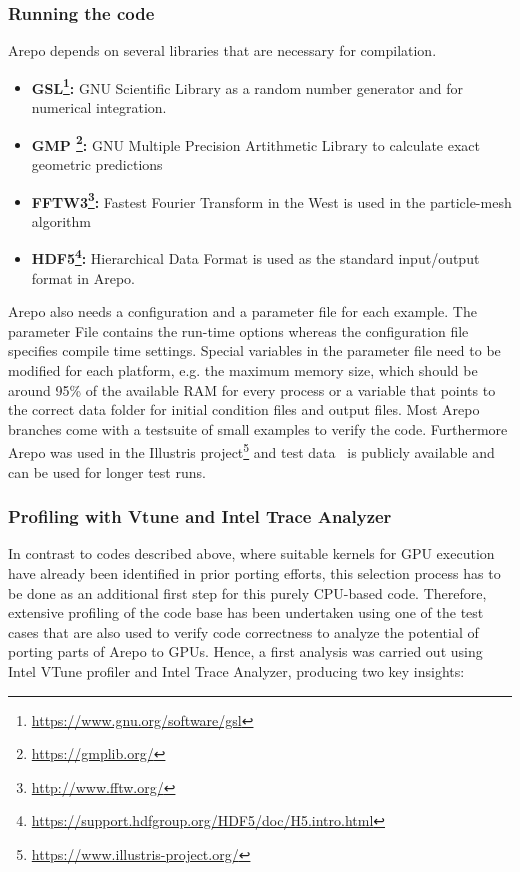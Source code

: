 \documentclass[../main]{subfiles}
\begin{document}
\subsubsection{Running the code}
Arepo depends on several libraries that are necessary for compilation. 
    \begin{itemize}
        \item{\textbf{GSL\footnote{\url{https://www.gnu.org/software/gsl}}:}} GNU Scientific Library as a random number generator and for numerical integration.
        \item{\textbf{GMP \footnote{\url{https://gmplib.org/}}:}} GNU Multiple Precision Artithmetic Library to calculate exact geometric predictions
        \item{\textbf{FFTW3\footnote{\url{http://www.fftw.org/}}:}} Fastest Fourier Transform in the West is used in the particle-mesh algorithm
        \item{\textbf{HDF5\footnote{\url{https://support.hdfgroup.org/HDF5/doc/H5.intro.html}}:}} Hierarchical Data Format is used as the standard input/output format in Arepo. 
    \end{itemize}
Arepo also needs a configuration and a parameter file for each example. The parameter File contains the run-time options whereas the configuration file specifies compile time settings. Special variables in the parameter file need to be modified for each platform, e.g. the maximum memory size, which should be around 95\% of the available RAM for every process or a variable that points to the correct data folder for initial condition files and output files. Most Arepo branches come with a testsuite of small examples to verify the code. Furthermore Arepo was used in the Illustris project\footnote{\url{https://www.illustris-project.org/}} and test data~\cite{Nelson_2015} is publicly available and can be used for longer test runs. 

\subsubsection{Profiling with Vtune and Intel Trace Analyzer}
In contrast to codes described above, where suitable kernels for GPU execution have already been identified in prior porting efforts, this selection process has to be done as an additional first step for this purely CPU-based code.
Therefore, extensive profiling of the code base has been undertaken using one of the test cases that are also used to verify code correctness to analyze the potential of porting parts of Arepo to GPUs.
Hence, a first analysis was carried out using Intel VTune profiler and Intel Trace Analyzer, producing two key insights:
\end{document}

